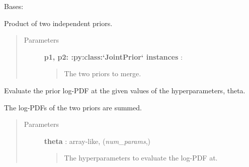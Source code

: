 \documentclass[letterpaper,10pt,english]{sphinxmanual}
\begin{document}
\begin{fulllineitems}
\label{gptools:gptools.utils.ProductJointPrior}
Bases: {\hyperref[gptools:gptools.utils.JointPrior]{}}

Product of two independent priors.
\begin{quote}\begin{description}
\item[{Parameters}] \leavevmode
\textbf{p1, p2: :py:class:{}`JointPrior{}` instances} :
\begin{quote}

The two priors to merge.
\end{quote}

\end{description}\end{quote}

\begin{fulllineitems}
\label{gptools:gptools.utils.ProductJointPrior.bounds}
\end{fulllineitems}


\begin{fulllineitems}
\label{gptools:gptools.utils.ProductJointPrior.__call__}
Evaluate the prior log-PDF at the given values of the hyperparameters, theta.

The log-PDFs of the two priors are summed.
\begin{quote}\begin{description}
\item[{Parameters}] \leavevmode
\textbf{theta} : array-like, (\emph{num\_params},)
\begin{quote}

The hyperparameters to evaluate the log-PDF at.
\end{quote}

\end{description}\end{quote}

\end{fulllineitems}



\end{fulllineitems}
\end{document}
